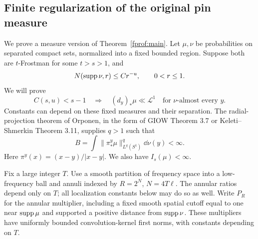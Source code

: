 




\subsection{Finite regularization of the original pin measure}

We prove a measure version of Theorem~\ref{fprof:main}. Let \(\mu,\nu\) be probabilities on separated compact sets, normalized into a fixed bounded region. Suppose both are \(t\)-Frostman for some \(t>s>1\), and
\begin{equation}\label{fprof:cover}
 N(\operatorname{supp}\nu,r)\leq C r^{-u},\qquad 0<r\leq1.
\end{equation}
We will prove
\begin{equation}\label{fprof:ac}
 C(s,u)<s-1\quad\Longrightarrow\quad
 (d_y)_*\mu\ll\mathcal L^1\quad\text{for \(\nu\)-almost every \(y\)}.
\end{equation}
Constants can depend on these fixed measures and their separation. The radial-projection theorem of Orponen, in the form of GIOW Theorem 3.7 or Keleti--Shmerkin Theorem 3.11, supplies \(q>1\) such that
\begin{equation}\label{fprof:radial}
 B=\int\|\pi^y_*\mu\|_{L^q(S^1)}^q\dd\nu(y)<\infty.
\end{equation}
Here \(\pi^y(x)=(x-y)/|x-y|\). We also have \(I_s(\mu)<\infty\).

Fix a large integer \(T\). Use a smooth partition of frequency space into a low-frequency ball and annuli indexed by \(R=2^N\), \(N=4T\ell\). The annular ratios depend only on \(T\); all localization constants below may do so as well. Write \(P_R\) for the annular multiplier, including a fixed smooth spatial cutoff equal to one near \(\operatorname{supp}\mu\) and supported a positive distance from \(\operatorname{supp}\nu\). These multipliers have uniformly bounded convolution-kernel first norms, with constants depending on \(T\).

